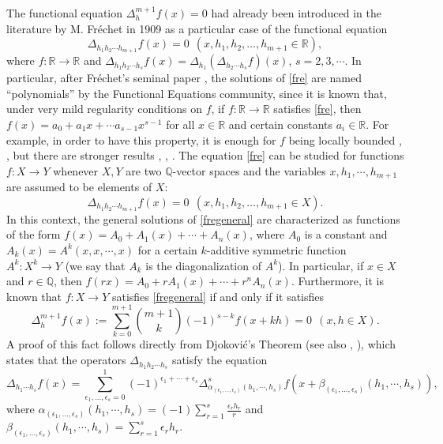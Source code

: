 \documentclass[12pt,a4paper]{amsart}
\theoremstyle{definition}
\begin{document}
The functional equation $\Delta_h^{m+1}f(x)=0$ had already been introduced in the literature by M. Fr\'{e}chet in 1909 as a particular case of the functional equation  
\begin{equation}\label{fre}
\Delta_{h_1h_2\cdots h_{m+1}}f(x)=0 \ \ (x,h_1,h_2,\dots,h_{m+1}\in \mathbb{R}),
\end{equation}
where $f:\mathbb{R}\to\mathbb{R}$ and $\Delta_{h_1h_2\cdots h_s}f(x)=\Delta_{h_1}\left(\Delta_{h_2\cdots h_s}f\right)(x)$, $s=2,3,\cdots$. In particular, after Fr\'{e}chet's 
seminal paper \cite{frechet}, the solutions of \eqref{fre} are named ``polynomials'' by the Functional Equations community, since it is known that, under very mild regularity conditions on $f$, if $f:\mathbb{R}\to\mathbb{R}$ satisfies \eqref{fre}, then $f(x)=a_0+a_1x+\cdots a_{s-1}x^{s-1}$ for all $x\in\mathbb{R}$ and certain constants $a_i\in\mathbb{R}$. For example, in order to have this property, it is enough for $f$ being locally bounded \cite{frechet}, \cite{almira_antonio}, but there are stronger results \cite{ger1}, \cite{kuczma1}, \cite{mckiernan}. The equation \eqref{fre} can be studied for functions $f:X\to Y$  whenever $X, Y$ are two  $\mathbb{Q}$-vector spaces and the variables $x,h_1,\cdots,h_{m+1}$ are assumed to be elements of $X$:
\begin{equation}\label{fregeneral}
\Delta_{h_1h_2\cdots h_{m+1}}f(x)=0 \ \ (x,h_1,h_2,\dots,h_{m+1}\in X).
\end{equation}
In this context, the general solutions of \eqref{fregeneral} are characterized as functions of the form $f(x)=A_0+A_1(x)+\cdots+A_n(x)$, where $A_0$ is a constant and $A_k(x)=A^k(x,x,\cdots,x)$ for a certain $k$-additive symmetric function $A^k:X^k\to Y$ (we say that $A_k$ is the diagonalization of $A^k$). In particular, if $x\in X$ and $r\in\mathbb{Q}$, then $f(rx)=A_0+rA_1(x)+\cdots+r^nA_n(x)$. Furthermore, it is known that $f:X\to Y$ satisfies \eqref{fregeneral} if and only if it satisfies 
\begin{equation}\label{frepasofijo}
\Delta_{h}^{m+1}f(x):=\sum_{k=0}^{m+1}\binom{m+1}{k}(-1)^{s-k}f(x+kh)=0 \ \ (x,h\in X).
\end{equation}
A proof of this fact follows directly from Djokovi\'{c}'s Theorem \cite{Dj} (see also \cite[Theorem 7.5, page 160]{HIR}, \cite[Theorem 15.1.2., page 418]{kuczma}), which states that  the operators $\Delta_{h_1 h_2\cdots h_s}$ satisfy the equation
\begin{equation}\label{igualdad}
\Delta_{h_1\cdots h_s}f(x)=
\sum_{\epsilon_1,\dots,\epsilon_s=0}^1(-1)^{\epsilon_1+\cdots+\epsilon_s}
\Delta_{\alpha_{(\epsilon_1,\dots,\epsilon_s)}(h_1,\cdots,h_s)}^sf(x+\beta_{(\epsilon_1,\dots,\epsilon_s)}(h_1,\cdots,h_s)),
\end{equation}
where $\alpha_{(\epsilon_1,\dots,\epsilon_s)}(h_1,\cdots,h_s)=(-1)\sum_{r=1}^s\frac{\epsilon_rh_r}{r}$ and $\beta_{(\epsilon_1,\dots,\epsilon_s)}(h_1,\cdots,h_s)=\sum_{r=1}^s\epsilon_rh_r$.  
\end{document}
